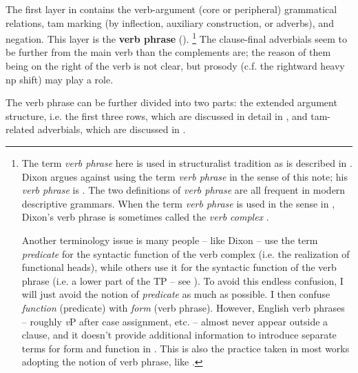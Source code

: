 \documentclass[UTF8, a4paper, oneside, scheme=plain, 12pt]{ctexbook}
\newcommand*{\concept}[1]{\textbf{#1}}
\newcommand*{\term}[1]{\emph{#1}}
\newcommand{\vP}{\textit{v}P}
\begin{document}
The first layer in  
contains the verb-argument (core or peripheral) grammatical relations,
\ac{tam} marking (by inflection, auxiliary construction, or adverbs), and negation.
This layer is the \concept{verb phrase} ().%
\footnote{
    The term \term{verb phrase} here 
    is used in structuralist tradition as is described in \citet{cgel}.
    Dixon argues against using the term \term{verb phrase} in the sense of this note;
    his \term{verb phrase} is .
    The two definitions of \term{verb phrase} are all frequent in modern descriptive grammars.
    When the term \term{verb phrase} is used in the sense in ,
    Dixon's verb phrase is sometimes called the \term{verb complex} \citep{Friesen2017}.

    Another terminology issue is many people -- like Dixon -- use the term \term{predicate}
    for the syntactic function of the verb complex
    (i.e. the realization of functional heads),
    while others use it for the syntactic function of the verb phrase 
    (i.e. a lower part of the TP -- see ).
    To avoid this endless confusion, 
    I will just avoid the notion of \term{predicate} as much as possible.
    I then confuse \emph{function} (predicate)
    with \emph{form} (verb phrase).
    However, English verb phrases -- roughly \vP{} after case assignment, etc. -- 
    almost never appear outside a clause,
    and it doesn't provide additional information 
    to introduce separate terms for form and function in .
    This is also the practice taken in most works adopting the notion of verb phrase,
    like \citet{Friesen2017}.
}
The clause-final adverbials 
seem to be further from the main verb than the complements are;
the reason of them being on the right of the verb is not clear, 
but prosody (c.f. the rightward heavy \acs{np} shift) may play a role.

The verb phrase can be further divided into two parts: 
the extended argument structure, 
i.e. the first three rows,
which are discussed in detail in ,
and \acs{tam}-related adverbials,
which are discussed in .
\end{document}

